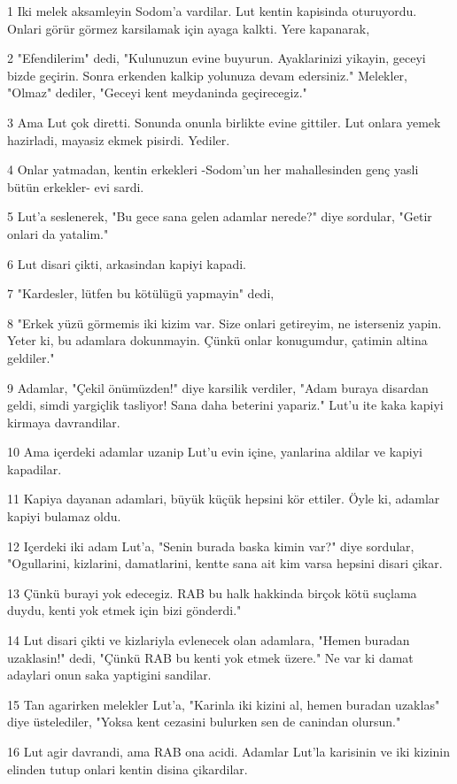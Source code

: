 \par 1 Iki melek aksamleyin Sodom'a vardilar. Lut kentin kapisinda oturuyordu. Onlari görür görmez karsilamak için ayaga kalkti. Yere kapanarak,
\par 2 "Efendilerim" dedi, "Kulunuzun evine buyurun. Ayaklarinizi yikayin, geceyi bizde geçirin. Sonra erkenden kalkip yolunuza devam edersiniz." Melekler, "Olmaz" dediler, "Geceyi kent meydaninda geçirecegiz."
\par 3 Ama Lut çok diretti. Sonunda onunla birlikte evine gittiler. Lut onlara yemek hazirladi, mayasiz ekmek pisirdi. Yediler.
\par 4 Onlar yatmadan, kentin erkekleri -Sodom'un her mahallesinden genç yasli bütün erkekler- evi sardi.
\par 5 Lut'a seslenerek, "Bu gece sana gelen adamlar nerede?" diye sordular, "Getir onlari da yatalim."
\par 6 Lut disari çikti, arkasindan kapiyi kapadi.
\par 7 "Kardesler, lütfen bu kötülügü yapmayin" dedi,
\par 8 "Erkek yüzü görmemis iki kizim var. Size onlari getireyim, ne isterseniz yapin. Yeter ki, bu adamlara dokunmayin. Çünkü onlar konugumdur, çatimin altina geldiler."
\par 9 Adamlar, "Çekil önümüzden!" diye karsilik verdiler, "Adam buraya disardan geldi, simdi yargiçlik tasliyor! Sana daha beterini yapariz." Lut'u ite kaka kapiyi kirmaya davrandilar.
\par 10 Ama içerdeki adamlar uzanip Lut'u evin içine, yanlarina aldilar ve kapiyi kapadilar.
\par 11 Kapiya dayanan adamlari, büyük küçük hepsini kör ettiler. Öyle ki, adamlar kapiyi bulamaz oldu.
\par 12 Içerdeki iki adam Lut'a, "Senin burada baska kimin var?" diye sordular, "Ogullarini, kizlarini, damatlarini, kentte sana ait kim varsa hepsini disari çikar.
\par 13 Çünkü burayi yok edecegiz. RAB bu halk hakkinda birçok kötü suçlama duydu, kenti yok etmek için bizi gönderdi."
\par 14 Lut disari çikti ve kizlariyla evlenecek olan adamlara, "Hemen buradan uzaklasin!" dedi, "Çünkü RAB bu kenti yok etmek üzere." Ne var ki damat adaylari onun saka yaptigini sandilar.
\par 15 Tan agarirken melekler Lut'a, "Karinla iki kizini al, hemen buradan uzaklas" diye üstelediler, "Yoksa kent cezasini bulurken sen de canindan olursun."
\par 16 Lut agir davrandi, ama RAB ona acidi. Adamlar Lut'la karisinin ve iki kizinin elinden tutup onlari kentin disina çikardilar.
